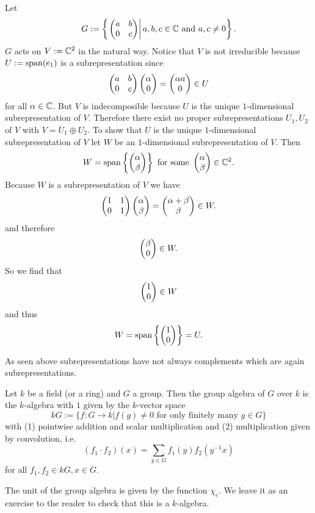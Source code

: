 \begin{expl}
 Let
 \[
  G := \left\{ \left. \begin{pmatrix}a&b\\0&c\end{pmatrix} \right| a,b,c \in \mathbb{C} \text{ and } a, c \neq 0 \right\}.
 \]
 $G$ acts on $V := \mathbb{C}^2$ in the natural way. Notice that $V$ is not irreducible because $U := \operatorname{span}(e_1)$ is a subrepresentation since
 \[
  \begin{pmatrix}a&b\\0&c\end{pmatrix} \begin{pmatrix}\alpha\\0\end{pmatrix} = \begin{pmatrix}\alpha a\\0\end{pmatrix} \in U
 \]
 for all $\alpha \in \mathbb{C}$. But $V$ is indecomposible because $U$ is the unique $1$-dimensional subrepresentation of $V$.  Therefore there exist no proper subrepresentations $U_1, U_2$ of $V$ with $V = U_1 \oplus U_2$. To show that $U$ is the unique $1$-dimensional subrepresentation of $V$ let $W$ be an $1$-dimensional subrepresentation of $V$. Then
 \[
  W = \operatorname{span}\left\{ \begin{pmatrix}\alpha\\\beta\end{pmatrix} \right\} \text{ for some } \begin{pmatrix}\alpha\\\beta\end{pmatrix} \in \mathbb{C}^2.
 \]
 Because $W$ is a subrepresentation of $V$ we have
 \[
  \begin{pmatrix}1&1\\0&1\end{pmatrix} \begin{pmatrix}\alpha\\\beta\end{pmatrix} = \begin{pmatrix}\alpha+\beta\\\beta\end{pmatrix} \in W.
 \]
 and therefore
 \[
  \begin{pmatrix}\beta\\0\end{pmatrix} \in W.
 \]
 So we find that
 \[
  \begin{pmatrix}1\\0\end{pmatrix} \in W
 \]
 and thus
 \[
  W = \operatorname{span}\left\{\begin{pmatrix}1\\0\end{pmatrix}\right\} = U.
 \]
\end{expl}


\begin{warn}
 As seen above subrepresentations have not always complements which are again subrepresentations.
\end{warn}


\begin{defi}
 Let $k$ be a field (or a ring) and $G$ a group. Then the group algebra of $G$ over $k$ is the $k$-algebra with $1$ given by the $k$-vector space
 \[
  kG := \{f : G \to k | f(g) \neq 0 \text{ for only finitely many } g \in G\}
 \]
 with (1) pointwise addition and scalar multiplication and (2) multiplication given by convolution, i.e.
 \[
  (f_1 \cdot f_2)(x) = \sum_{y \in G} f_1(y) f_2\left(y^{-1}x\right)
 \]
 for all $f_1, f_2 \in kG, x \in G$.
\end{defi}

The unit of the group algebra is given by the function $\chi_e$. We leave it as an exercise to the reader to check that this is a $k$-algebra.

